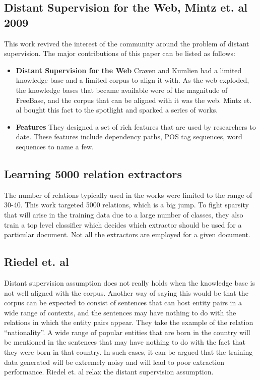 \documentclass[a4paper,10pt]{article}
\begin{document}
\subsection{Distant Supervision for the Web, Mintz et. al 2009 \cite{mintz}}
This work revived the interest of the community around the problem of distant supervision.
The major contributions of this paper can be listed as follows:
\begin{itemize}
 \item \textbf{Distant Supervision for the Web}
 Craven and Kumlien had a limited knowledge base and a limited corpus to align it with.
 As the web exploded, the knowledge bases that became available were of the magnitude of FreeBase, and the
 corpus that can be aligned with it was the web. Mintz et. al bought this fact to the spotlight and sparked 
 a series of works.
 
 \item \textbf{Features}
 They designed a set of rich features that are used by researchers to date. These features include dependency paths, POS tag sequences, word sequences to name a few.
 
\end{itemize}

\subsection{Learning 5000 relation extractors \cite{rel}}
The number of relations typically used in the works were limited to the range of 30-40. 
This work targeted 5000 relations, which is a big jump. To fight sparsity that will arise 
in the training data due to a large number of classes, they also train a top level classifier
which decides which extractor should be used for a particular document. Not all the extractors 
are employed for a given document.

\subsection{Riedel et. al \cite{riedel}}
Distant supervision assumption does not really holds when the knowledge base is not well aligned with the corpus.
Another way of saying this would be that the corpus can be expected to consist of sentences that can host entity pairs
in a wide range of contexts, and the sentences may have nothing to do with the relations in which the entity pairs appear.
They take the example of the relation ``nationality''. A wide range of popular entities that are born in the country 
will be mentioned in the sentences that may have nothing to do with the fact that they were born in that country.
In such cases, it can be argued that the training data generated will be extremely noisy and will lead to poor extraction 
performance. Riedel et. al relax the distant supervision assumption.
\end{document}
